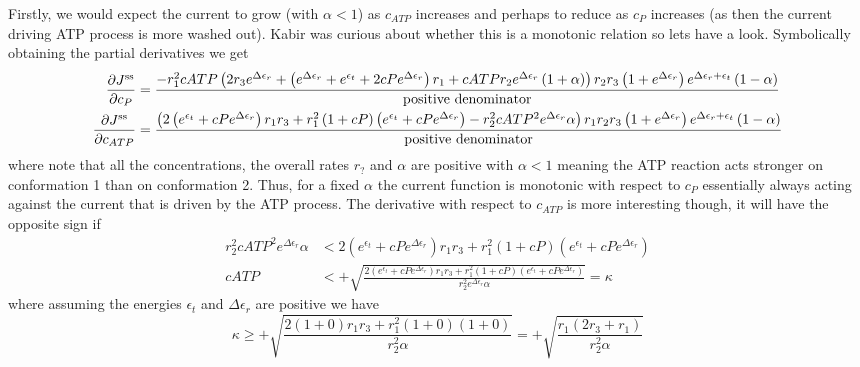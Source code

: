 \documentclass[11pt]{article}
\begin{document}
Firstly, we would expect the current to grow (with $\alpha < 1$) as $c_{ATP}$ increases and perhaps to reduce as $c_P$ increases (as then the current driving ATP process is more washed out).
Kabir was curious about whether this is a monotonic relation so lets have a look.
Symbolically obtaining the partial derivatives we get
\begin{align}
	\pdv{J^\text{ss}}{c_P}     & = \frac{-r_1^{2} cATP \left( 2 r_3 e^{\Delta\epsilon_{r}} + \left( e^{\Delta\epsilon_{r}} + e^{\epsilon_{t}} + 2 cP e^{\Delta\epsilon_{r}} \right) r_1 + cATP r_2 e^{\Delta\epsilon_{r}} \left( 1 + \alpha \right) \right) r_2 r_3 \left( 1 + e^{\Delta\epsilon_{r}} \right) e^{\Delta\epsilon_{r} + \epsilon_{t}} \left( 1 - \alpha \right)}{\text{positive denominator}}                     \\
	\pdv{J^\text{ss}}{c_{ATP}} & = \frac{ \left( 2 \left( e^{\epsilon_{t}} + cP e^{\Delta\epsilon_{r}} \right) r_1 r_3 + r_1^{2} \left( 1 + cP \right) \left( e^{\epsilon_{t}} + cP e^{\Delta\epsilon_{r}} \right) - r_2^{2} cATP^{2} e^{\Delta\epsilon_{r}} \alpha \right) r_1 r_2 r_3 \left( 1 + e^{\Delta\epsilon_{r}} \right) e^{\Delta\epsilon_{r} + \epsilon_{t}} \left( 1 - \alpha \right)}{\text{positive denominator}}
\end{align}
where note that all the concentrations, the overall rates $r_?$ and $\alpha$ are positive with $\alpha < 1$ meaning the ATP reaction acts stronger on conformation 1 than on conformation 2.
Thus, for a fixed $\alpha$ the current function is monotonic with respect to $c_P$ essentially always acting against the current that is driven by the ATP process.
The derivative with respect to $c_{ATP}$ is more interesting though, it will have the opposite sign if
\begin{align}
	r_2^{2} cATP^{2} e^{\Delta\epsilon_{r}} \alpha & < 2 \left( e^{\epsilon_{t}} + cP e^{\Delta\epsilon_{r}} \right) r_1 r_3 + r_1^{2} \left( 1 + cP \right) \left( e^{\epsilon_{t}} + cP e^{\Delta\epsilon_{r}} \right)                                                                \\
	cATP                                           & < +\sqrt{\frac{2 \left( e^{\epsilon_{t}} + cP e^{\Delta\epsilon_{r}} \right) r_1 r_3 + r_1^{2} \left( 1 + cP \right) \left( e^{\epsilon_{t}} + cP e^{\Delta\epsilon_{r}} \right)}{r_2^{2} e^{\Delta\epsilon_{r}} \alpha}} = \kappa
\end{align}
where assuming the energies $\epsilon_t$ and $\Delta\epsilon_r$ are positive we have
\begin{equation}
	\kappa \geq +\sqrt{\frac{2 \left( 1 + 0 \right) r_1 r_3 + r_1^{2} \left( 1 + 0 \right) \left( 1 + 0 \right)}{r_2^{2} \alpha}} = +\sqrt{\frac{r_1(2 r_3 + r_1)}{r_2^{2} \alpha}}
\end{equation}
\end{document}
